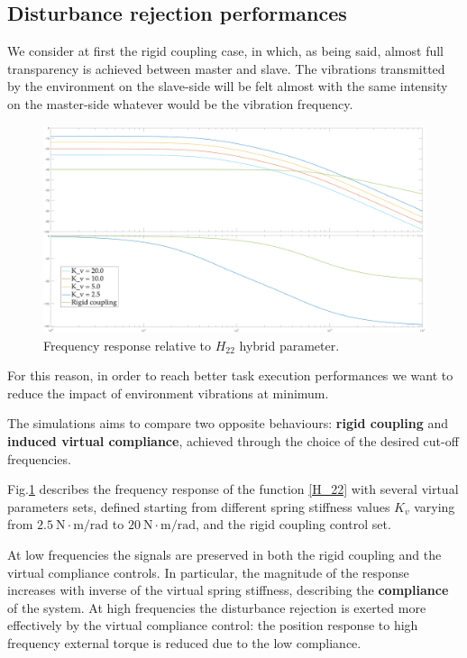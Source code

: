 \subsection{Disturbance rejection performances}

We consider at first the rigid coupling case, in which, as being said, almost
full transparency is achieved between master and slave. The vibrations
transmitted by the environment on the slave-side will be felt almost with the same intensity on the master-side whatever would be the vibration frequency.

\begin{figure}[h]
	\centering
	\includegraphics[width=1\linewidth]{Images/bodo}
	\caption{Frequency response relative to $ H_{22} $ hybrid parameter.}
	\label{fig:bodo}
\end{figure}

For this reason, in order to reach better task execution performances we want to
reduce the impact of environment vibrations at minimum.

The simulations aims to compare two opposite behaviours: \textbf{rigid coupling}
and \textbf{induced virtual compliance}, achieved through the choice of
the desired cut-off frequencies.

Fig.\ref{fig:bodo} describes the frequency response of the function \eqref{H_22} with several virtual parameters sets, defined starting from different spring stiffness values $ K_v $ varying from $ 2.5 \ \text{N}\cdot\text{m}/\text{rad} $ to $ 20 \ \text{N}\cdot\text{m}/\text{rad} $, and the rigid coupling control set.

At low frequencies the signals are preserved in both the rigid coupling and the virtual compliance controls. In particular, the magnitude of the response increases with inverse of the virtual spring stiffness, describing the \textbf{compliance} of the system. At high frequencies the disturbance rejection is exerted more effectively by the virtual compliance control: the position response to high frequency external torque is reduced due to the low compliance.

